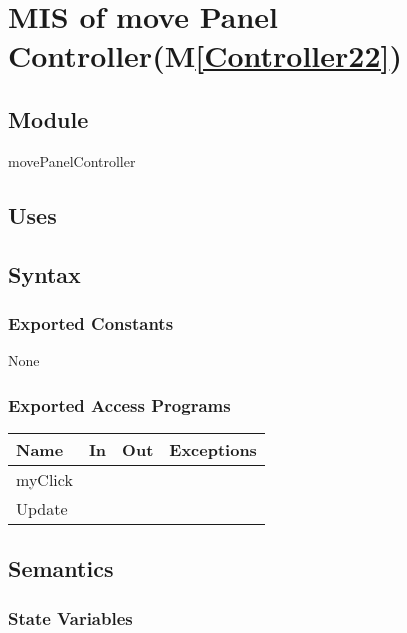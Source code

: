 \documentclass[12pt, titlepage]{article}
\newcommand{\mref}[1]{M\ref{#1}}
\begin{document}

\newpage


\section{MIS of move Panel Controller(\mref{Controller22})}  

\subsection{Module}
movePanelController


\subsection{Uses}

\subsection{Syntax}
\subsubsection{Exported Constants}
None
\subsubsection{Exported Access Programs}

\begin{center}
\begin{tabular}{| l | l | l | p{5cm}|}
\hline
\textbf{Name} & \textbf{In} & \textbf{Out} & \textbf{Exceptions} \\
\hline
 myClick&  &  &  \\
\hline
 Update&  & & \\
\hline
\end{tabular}
\end{center}

\subsection{Semantics}

\subsubsection{State Variables}
\end{document}
